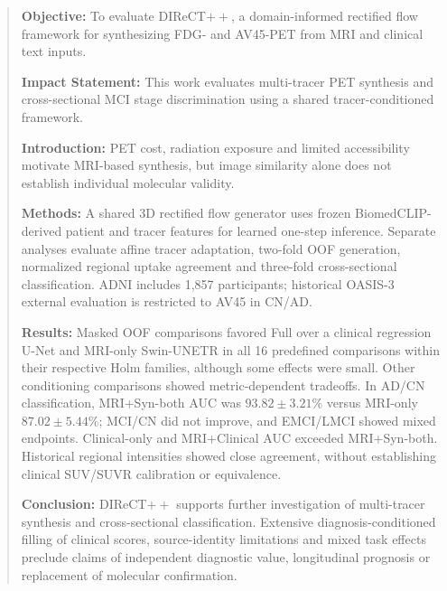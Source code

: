\begin{abstract}
\noindent\textbf{Objective:} To evaluate DIReCT$++$, a domain-informed rectified flow framework for synthesizing FDG- and AV45-PET from MRI and clinical text inputs.

\noindent\textbf{Impact Statement:} This work evaluates multi-tracer PET synthesis and cross-sectional MCI stage discrimination using a shared tracer-conditioned framework.

\noindent\textbf{Introduction:} PET cost, radiation exposure and limited accessibility motivate MRI-based synthesis, but image similarity alone does not establish individual molecular validity.

\noindent\textbf{Methods:} A shared 3D rectified flow generator uses frozen BiomedCLIP-derived patient and tracer features for learned one-step inference. Separate analyses evaluate affine tracer adaptation, two-fold OOF generation, normalized regional uptake agreement and three-fold cross-sectional classification. ADNI includes 1,857 participants; historical OASIS-3 external evaluation is restricted to AV45 in CN/AD.

\noindent\textbf{Results:} Masked OOF comparisons favored Full over a clinical regression U-Net and MRI-only Swin-UNETR in all 16 predefined comparisons within their respective Holm families, although some effects were small. Other conditioning comparisons showed metric-dependent tradeoffs. In AD/CN classification, MRI+Syn-both AUC was $93.82\pm3.21\%$ versus MRI-only $87.02\pm5.44\%$; MCI/CN did not improve, and EMCI/LMCI showed mixed endpoints. Clinical-only and MRI+Clinical AUC exceeded MRI+Syn-both. Historical regional intensities showed close agreement, without establishing clinical SUV/SUVR calibration or equivalence.

\noindent\textbf{Conclusion:} DIReCT$++$ supports further investigation of multi-tracer synthesis and cross-sectional classification. Extensive diagnosis-conditioned filling of clinical scores, source-identity limitations and mixed task effects preclude claims of independent diagnostic value, longitudinal prognosis or replacement of molecular confirmation.
\end{abstract}
